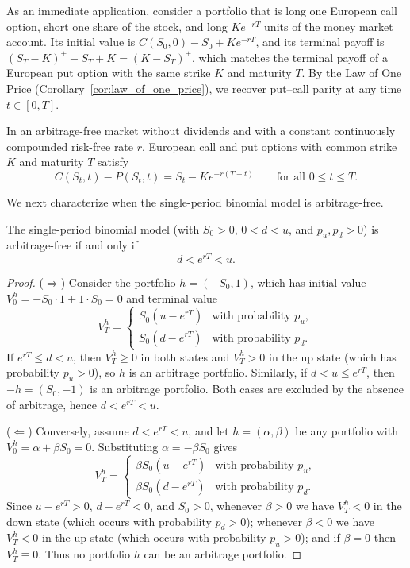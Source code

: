 As an immediate application, consider a portfolio that is long one European call option, short one share of the stock, and long $K e^{-rT}$ units of the money market account. Its initial value is $C(S_0, 0) - S_0 + K e^{-rT}$, and its terminal payoff is $(S_T - K)^+ - S_T + K = (K - S_T)^+$, which matches the terminal payoff of a European put option with the same strike $K$ and maturity $T$. By the Law of One Price (Corollary~\ref{cor:law_of_one_price}), we recover put--call parity at any time $t \in [0, T]$.

\begin{theorem}
\label{thm:put_call_parity_ch2}
In an arbitrage-free market without dividends and with a constant continuously compounded risk-free rate $r$, European call and put options with common strike $K$ and maturity $T$ satisfy
\[
    C(S_t, t) - P(S_t, t) = S_t - K e^{-r(T-t)} \qquad \text{for all } 0 \le t \le T.
\]
\end{theorem}

We next characterize when the single-period binomial model is arbitrage-free.

\begin{theorem}
\label{thm:no_arbitrage_1p}
The single-period binomial model (with $S_0 > 0$, $0 < d < u$, and $p_u, p_d > 0$) is arbitrage-free if and only if
\[
    d < e^{rT} < u.
\]
\end{theorem}

\begin{proof}
($\Rightarrow$) Consider the portfolio $h = (-S_0, 1)$, which has initial value $V_0^h = -S_0 \cdot 1 + 1 \cdot S_0 = 0$ and terminal value
\[
    V_T^h =
    \begin{cases}
        S_0 (u - e^{rT}) & \text{with probability } p_u, \\
        S_0 (d - e^{rT}) & \text{with probability } p_d.
    \end{cases}
\]
If $e^{rT} \le d < u$, then $V_T^h \ge 0$ in both states and $V_T^h > 0$ in the up state (which has probability $p_u > 0$), so $h$ is an arbitrage portfolio. Similarly, if $d < u \le e^{rT}$, then $-h = (S_0, -1)$ is an arbitrage portfolio. Both cases are excluded by the absence of arbitrage, hence $d < e^{rT} < u$.

($\Leftarrow$) Conversely, assume $d < e^{rT} < u$, and let $h = (\alpha, \beta)$ be any portfolio with $V_0^h = \alpha + \beta S_0 = 0$. Substituting $\alpha = -\beta S_0$ gives
\[
    V_T^h =
    \begin{cases}
        \beta S_0 (u - e^{rT}) & \text{with probability } p_u, \\
        \beta S_0 (d - e^{rT}) & \text{with probability } p_d.
    \end{cases}
\]
Since $u - e^{rT} > 0$, $d - e^{rT} < 0$, and $S_0 > 0$, whenever $\beta > 0$ we have $V_T^h < 0$ in the down state (which occurs with probability $p_d > 0$); whenever $\beta < 0$ we have $V_T^h < 0$ in the up state (which occurs with probability $p_u > 0$); and if $\beta = 0$ then $V_T^h \equiv 0$. Thus no portfolio $h$ can be an arbitrage portfolio.
\end{proof}

